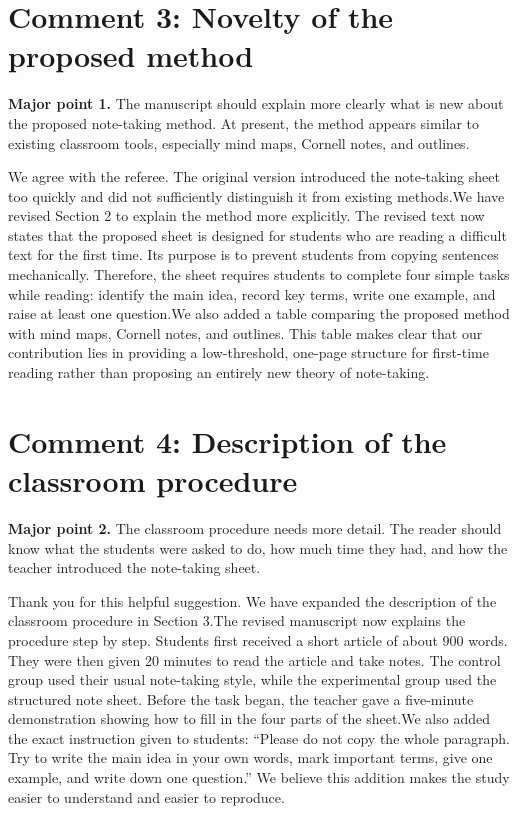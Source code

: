 \section*{Comment 3: Novelty of the proposed method}
\begin{commentbox}
\textbf{Major point 1.} The manuscript should explain more clearly what is new about the proposed note-taking method. At present, the method appears similar to existing classroom tools, especially mind maps, Cornell notes, and outlines.
\end{commentbox}
\begin{replybox}
We agree with the referee. The original version introduced the note-taking sheet too quickly and did not sufficiently distinguish it from existing methods.We have revised Section 2 to explain the method more explicitly. The revised text now states that the proposed sheet is designed for students who are reading a difficult text for the first time. Its purpose is to prevent students from copying sentences mechanically. Therefore, the sheet requires students to complete four simple tasks while reading: identify the main idea, record key terms, write one example, and raise at least one question.We also added a table comparing the proposed method with mind maps, Cornell notes, and outlines. This table makes clear that our contribution lies in providing a low-threshold, one-page structure for first-time reading rather than proposing an entirely new theory of note-taking.
\end{replybox}
\section*{Comment 4: Description of the classroom procedure}
\begin{commentbox}
\textbf{Major point 2.} The classroom procedure needs more detail. The reader should know what the students were asked to do, how much time they had, and how the teacher introduced the note-taking sheet.
\end{commentbox}
\begin{replybox}
Thank you for this helpful suggestion. We have expanded the description of the classroom procedure in Section 3.The revised manuscript now explains the procedure step by step. Students first received a short article of about 900 words. They were then given 20 minutes to read the article and take notes. The control group used their usual note-taking style, while the experimental group used the structured note sheet. Before the task began, the teacher gave a five-minute demonstration showing how to fill in the four parts of the sheet.We also added the exact instruction given to students: ``Please do not copy the whole paragraph. Try to write the main idea in your own words, mark important terms, give one example, and write down one question.'' We believe this addition makes the study easier to understand and easier to reproduce.
\end{replybox}
